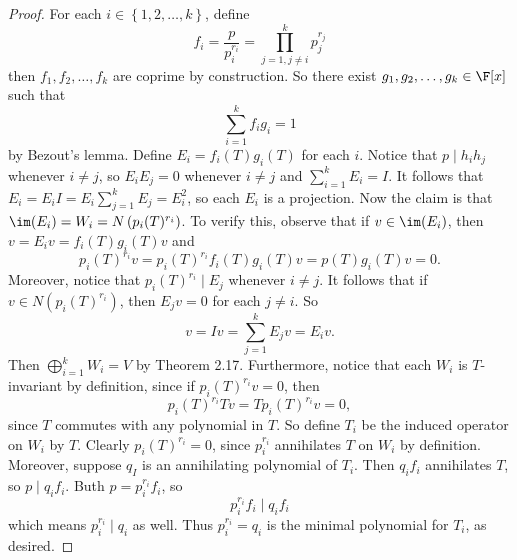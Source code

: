\documentclass[linearalgebraII]{subfiles}
\begin{document}
    \begin{proof}
        For each $i\in \left\lbrace 1, 2, \ldots, k \right\rbrace$, define
        \begin{equation*}
            f_i = \frac{p}{p_i^{r_i}} = \prod^{k}_{j=1,j\neq i} p_j^{r_j}
        \end{equation*}
        then $f_1, f_2, \ldots, f_k$ are coprime by construction. So there exist $g_1, g_2, \ldots, g_k\in \F[x]$ such that
        \begin{equation*}
            \sum^{k}_{i=1} f_ig_i = 1
        \end{equation*}
        by Bezout's lemma. Define $E_i = f_i(T)g_i(T)$ for each $i$. Notice that $p\mid h_ih_j$ whenever $i\neq j$, so $E_iE_j = 0$ whenever $i\neq j$ and $\sum^{k}_{i=1} E_i = I$. It follows that $E_i = E_iI = E_i \sum^{k}_{j=1} E_j = E_i^2$, so each $E_i$ is a projection. Now the claim is that $\im(E_i) = W_i = N \left( p_i(T)^{r_i} \right)$. To verify this, observe that if $v\in \im(E_i)$, then $v = E_iv = f_i(T)g_i(T)v$ and
        \begin{equation*}
            p_i(T)^{r_i}v = p_i(T)^{r_i}f_i(T)g_i(T)v = p(T)g_i(T)v = 0.
        \end{equation*}
        Moreover, notice that $p_i(T)^{r_i}\mid E_j$ whenever $i\neq j$. It follows that if $v\in N \left( p_i(T)^{r_i} \right)$, then $E_jv = 0$ for each $j\neq i$. So
        \begin{equation*}
            v = Iv = \sum^{k}_{j=1} E_jv = E_iv.
        \end{equation*}
        Then $\bigoplus^{k}_{i=1} W_i = V$ by Theorem 2.17. Furthermore, notice that each $W_i$ is $T$-invariant by definition, since if $p_i(T)^{r_i}v = 0$, then
        \begin{equation*}
            p_i(T)^{r_i}Tv = Tp_i(T)^{r_i}v = 0,
        \end{equation*}
        since $T$ commutes with any polynomial in $T$. So define $T_i$ be the induced operator on $W_i$ by $T$. Clearly $p_i(T)^{r_i} = 0$, since $p_i^{r_i}$ annihilates $T$ on $W_i$ by definition. Moreover, suppose $q_I$ is an annihilating polynomial of $T_i$. Then $q_if_i$ annihilates $T$, so $p\mid q_if_i$. Buth $p = p_i^{r_i}f_i$, so
        \begin{equation*}
            p_i^{r_i}f_i\mid q_if_i
        \end{equation*}
        which means $p_i^{r_i}\mid q_i$ as well. Thus $p_i^{r_i} = q_i$ is the minimal polynomial for $T_i$, as desired.
    \end{proof}
\end{document}
